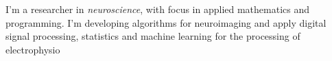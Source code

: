 \begin{cventries}
    I'm a researcher in \emph{neuroscience}, with focus in applied mathematics and programming.
    I'm developing algorithms for neuroimaging and apply digital signal processing, statistics
    and machine learning for the processing of electrophysio
\end{cventries}
